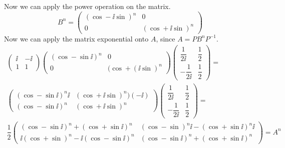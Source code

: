 Now we can apply the power operation on the matrix.
\begin{equation*}
B^n = \left( \begin{array}{cc}
(\cos - \ii \sin)^n & 0\\
 0 & (\cos + \ii \sin )^n
\end{array}
\right)
\end{equation*}
Now we can apply the matrix exponential onto $A$, since $A = PB^{n}P^{-1}$.
\begin{gather*}
\left( \begin{array}{cc}
\ii & - \ii \\
1 & 1
\end{array}
\right)
\left( \begin{array}{cc}
(\cos - \sin \ii)^n & 0 \\
0 & (\cos + (\ii \sin )^n
\end{array}
\right)
\left( \begin{array}{cc}
\dfrac{1}{2\ii} & \dfrac{1}{2} \\
-\dfrac{1}{2 \ii} & \dfrac{1}{2}
\end{array}
\right)
=\\
\left( \begin{array}{cc}
(\cos - \sin \ii)^n \ii & (\cos + \ii \sin)^n)(-\ii) \\
(\cos - \sin \ii)^n & (\cos + \ii \sin)^n 
\end{array}
\right)
\left( \begin{array}{cc}
\dfrac{1}{2\ii} & \dfrac{1}{2} \\
-\dfrac{1}{2 \ii} & \dfrac{1}{2}
\end{array}
\right)
=\\
\dfrac{1}{2}
\left( \begin{array}{cc}
\left( \cos - \sin \ii \right)^n + (\cos + \sin \ii )^n & (\cos - \sin)^n \ii - (\cos + \sin \ii)^n \ii \\ 
\ii (\cos + \sin)^n  - \ii (\cos - \sin \ii )^n & \left( \cos - \sin \ii \right)^n + (\cos + \sin \ii )^n 
\end{array}
\right)
=
A^n
\end{gather*}


